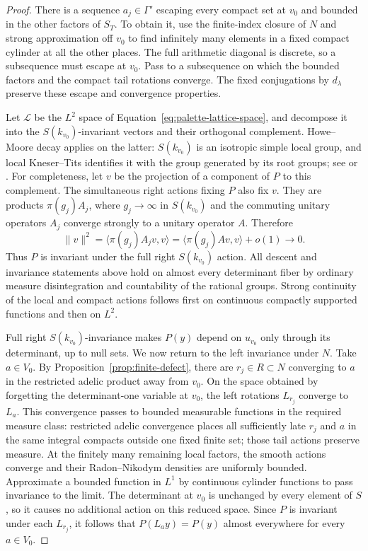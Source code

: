 \begin{proof}
There is a sequence $a_j\in\Gamma'$ escaping every compact set at
$v_0$ and bounded in the other factors of $S_T$. To obtain it, use the
finite-index closure of $N$ and strong approximation off $v_0$ to find
infinitely many elements in a fixed compact cylinder at all the other
places. The full arithmetic diagonal is discrete, so a subsequence
must escape at $v_0$. Pass to a subsequence on which the bounded factors
and the compact tail rotations converge. The fixed conjugations by
$d_\lambda$ preserve these escape and convergence properties.

Let $\mathcal L$ be the $L^2$ space of
Equation~\ref{eq:palette-lattice-space}, and decompose it into the
$S(k_{v_0})$-invariant vectors and their orthogonal complement.
Howe--Moore decay applies on the latter: $S(k_{v_0})$ is an isotropic
simple local group, and local Kneser--Tits identifies it with the group
generated by its root groups; see \cite{HoweMoore} or
\cite[Theorem~4.19 and Definition~4.23]{Ciobotaru}.
For completeness, let $v$ be the projection of a component of $P$ to
this complement. The simultaneous right actions fixing $P$ also fix
$v$. They are products $\pi(g_j)A_j$, where $g_j\to\infty$ in
$S(k_{v_0})$ and the commuting unitary operators $A_j$ converge strongly
to a unitary operator $A$. Therefore
\[
 \|v\|^2
 =\langle\pi(g_j)A_jv,v\rangle
 =\langle\pi(g_j)Av,v\rangle+o(1)\longrightarrow0.
\]
Thus $P$ is invariant under the full right $S(k_{v_0})$ action.
All descent and invariance statements above hold on almost every
determinant fiber by ordinary measure disintegration and countability
of the rational groups. Strong continuity of the local and compact
actions follows first on continuous compactly supported functions and
then on $L^2$.

Full right $S(k_{v_0})$-invariance makes $P(y)$ depend on $u_{v_0}$
only through its determinant, up to null sets. We now return to the
left invariance under $N$. Take $a\in V_0$. By
Proposition~\ref{prop:finite-defect}, there are $r_j\in R\subset N$
converging to $a$ in the restricted adelic product away from $v_0$.
On the space obtained by forgetting the determinant-one variable at
$v_0$, the left rotations $L_{r_j}$ converge to $L_a$. This convergence
passes to bounded measurable functions in the required measure class:
restricted adelic convergence places all sufficiently late $r_j$ and
$a$ in the same integral compacts outside one fixed finite set; those
tail actions preserve measure. At the finitely many remaining local
factors, the smooth actions converge and their Radon--Nikodym densities
are uniformly bounded. Approximate a bounded function in $L^1$ by
continuous cylinder functions to pass invariance to the limit.
The determinant at $v_0$ is unchanged by every element of $S$, so it
causes no additional action on this reduced space.
Since $P$ is invariant under each $L_{r_j}$, it follows that
$P(L_a y)=P(y)$ almost everywhere for every $a\in V_0$.


\end{proof}

